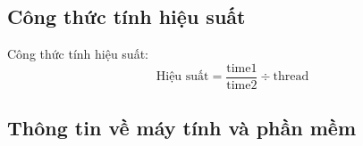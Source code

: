 \subsection{Công thức tính hiệu suất}


Công thức tính hiệu suất:
\begin{equation}
 \text{{Hiệu suất}} = \frac{{\text{{time1}}}}{{\text{{time2}}}} \div \text{{thread}}
\end{equation}


\subsection{Thông tin về máy tính và phần mềm}




 
 
 